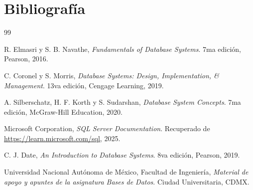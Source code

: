 \newpage
\section*{Bibliografía}

\begin{thebibliography}{99}
	
	R. Elmasri y S. B. Navathe, \textit{Fundamentals of Database Systems}. 7ma edición, Pearson, 2016.
	
	C. Coronel y S. Morris, \textit{Database Systems: Design, Implementation, \& Management}. 13va edición, Cengage Learning, 2019.
	
	A. Silberschatz, H. F. Korth y S. Sudarshan, \textit{Database System Concepts}. 7ma edición, McGraw-Hill Education, 2020.
	
	Microsoft Corporation, \textit{SQL Server Documentation}. Recuperado de \url{https://learn.microsoft.com/sql}, 2025.
	
	C. J. Date, \textit{An Introduction to Database Systems}. 8va edición, Pearson, 2019.
	
	Universidad Nacional Autónoma de México, Facultad de Ingeniería, \textit{Material de apoyo y apuntes de la asignatura Bases de Datos}. Ciudad Universitaria, CDMX.
	
\end{thebibliography}